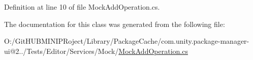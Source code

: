 Definition at line 10 of file Mock\+Add\+Operation.\+cs.



The documentation for this class was generated from the following file\+:\begin{DoxyCompactItemize}
\item 
O\+:/\+Git\+H\+U\+B\+M\+I\+N\+I\+P\+Roject/\+Library/\+Package\+Cache/com.\+unity.\+package-\/manager-\/ui@2../\+Tests/\+Editor/\+Services/\+Mock/\mbox{\hyperlink{_mock_add_operation_8cs}{Mock\+Add\+Operation.\+cs}}\end{DoxyCompactItemize}
